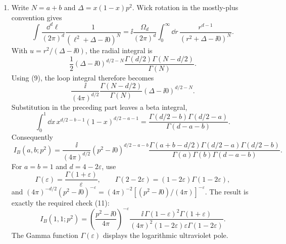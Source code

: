 \begin{enumerate}
\begin{enumerate}
\item
Write \(N=a+b\) and \(\Delta=x(1-x)p^2\).  Wick rotation in the
mostly-plus convention gives
\[
 \int\frac{\dd^d\ell}{(2\pi)^d}
 \frac{1}{(\ell^2+\Delta-\ii0)^N}
 =\ii\frac{\Omega_d}{(2\pi)^d}
 \int_0^\infty \dd r\,\frac{r^{d-1}}{(r^2+\Delta-\ii0)^N}.
\]
With \(u=r^2/(\Delta-\ii0)\), the radial integral is
\[
 \frac12(\Delta-\ii0)^{d/2-N}
 \frac{\Gamma(d/2)\Gamma(N-d/2)}{\Gamma(N)}.
\]
Using (9), the loop integral therefore becomes
\[
 \frac{\ii}{(4\pi)^{d/2}}
 \frac{\Gamma(N-d/2)}{\Gamma(N)}
 (\Delta-\ii0)^{d/2-N}.
\]
Substitution in the preceding part leaves a beta integral,
\[
 \int_0^1\dd x\,
 x^{d/2-b-1}(1-x)^{d/2-a-1}
 =\frac{\Gamma(d/2-b)\Gamma(d/2-a)}
 {\Gamma(d-a-b)}.
\]
Consequently
\[
 \boxed{\;
 I_B(a,b;p^2)
 =\frac{\ii}{(4\pi)^{d/2}}
 (p^2-\ii0)^{d/2-a-b}
 \frac{\Gamma(a+b-d/2)\Gamma(d/2-a)\Gamma(d/2-b)}
 {\Gamma(a)\Gamma(b)\Gamma(d-a-b)}.
 \;}
\]
For \(a=b=1\) and \(d=4-2\varepsilon\), use
\[
 \Gamma(\varepsilon)=\frac{\Gamma(1+\varepsilon)}{\varepsilon},
 \qquad
 \Gamma(2-2\varepsilon)=(1-2\varepsilon)
 \Gamma(1-2\varepsilon),
\]
and
\((4\pi)^{-d/2}(p^2-\ii0)^{-\varepsilon}
=(4\pi)^{-2}[(p^2-\ii0)/(4\pi)]^{-\varepsilon}\).  The result is exactly
the required check (11):
\[
 I_B(1,1;p^2)
 =\left(\frac{p^2-\ii0}{4\pi}\right)^{-\varepsilon}
 \frac{\ii\,\Gamma(1-\varepsilon)^2\Gamma(1+\varepsilon)}
 {(4\pi)^2(1-2\varepsilon)\varepsilon
 \Gamma(1-2\varepsilon)}.
\]
The Gamma function \(\Gamma(\varepsilon)\) displays the logarithmic
ultraviolet pole.
\end{enumerate}


\end{enumerate}
